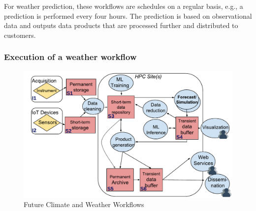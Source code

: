 \documentclass[a4paper, twocolumn]{article}
\begin{document}
For weather prediction, these workflows are schedules on a regular basis, e.g., a prediction is performed every four hours.
The prediction is based on observational data and outputs data products that are processed further and distributed to customers.

\subsubsection{Execution of a weather workflow}



\begin{figure}[b]
  \includegraphics[width=\columnwidth]{climateweather-workflow}
  \caption{Future Climate and Weather Workflows}
  \label{fig:climateWeather}
\end{figure}
\end{document}
